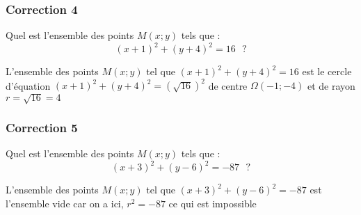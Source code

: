 \documentclass[15pt, mathserif]{beamer}
\begin{document}
\begin{frame}
\vspace{-10mm}
	\frametitle{Correction 4}
Quel est l'ensemble des points $M(x;y)$ tels que :$$(x+1)^2+(y+4)^2 =16 \text{~~?} $$ 
 
 \bigskip 
 L'ensemble des points $M(x; y)$ tel que $(x+1)^2+(y+4)^2 =16$ est le cercle d'équation $(x+1)^2+(y+4)^2 =\left(\sqrt{16}\right)^2$ de centre $\Omega(-1;-4)$ et de rayon $r =\sqrt{16}=4$\end{frame}


\begin{frame}
\vspace{-10mm}
	\frametitle{Correction 5}
Quel est l'ensemble des points $M(x;y)$ tels que :$$(x+3)^2+(y-6)^2 =-87 \text{~~?} $$ 
 
 \bigskip 
 L'ensemble des points $M(x; y)$ tel que $(x+3)^2+(y-6)^2 =-87$ est l'ensemble vide car on a ici, $r^2=-87$ ce qui est impossible\end{frame}
\end{document}
